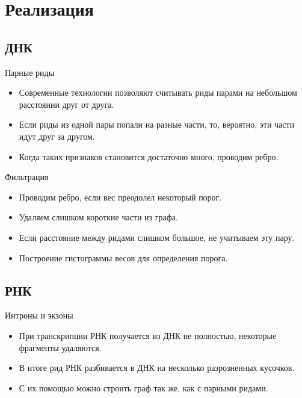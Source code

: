 \documentclass{beamer}
\newcommand{\cimg}[2]{%
	\begin{center}%
		\ifthenelse{\equal{#2}{}}{%
			\texttt{[image: \#1]}
		}{%
			\texttt{[image: \#1]}
		}%
	\end{center}%
}
\begin{document}
\section{Реализация}
\subsection{ДНК}

\begin{frame}[t]{Парные риды}
    \begin{itemize}
    \item
        Современные технологии позволяют считывать риды парами на небольшом
        расстоянии друг от друга.
    \item
        Если риды из одной пары попали на разные части, то, вероятно, эти части
        идут друг за другом.
    \item
        Когда таких признаков становится достаточно много, проводим ребро.
    \end{itemize}
    \cimg{2.jpg}{0.75}
\end{frame}

\begin{frame}[t]{Фильтрация}
    \begin{itemize}
    \item
        Проводим ребро, если вес преодолел некоторый порог.
    \item
        Удаляем слишком короткие части из графа.
    \item
        Если расстояние между ридами слишком большое, не учитываем эту пару.
    \item
        Построение гистограммы весов для определения порога.
    \end{itemize}
\end{frame}

\subsection{РНК}

\begin{frame}[t]{Интроны и экзоны}
    \begin{itemize}
    \item
        При транскрипции РНК получается из ДНК не полностью, некоторые фрагменты 
        удаляются.
    \item
        В итоге рид РНК разбивается в ДНК на несколько разрозненных кусочков.
    \item
        С их помощью можно строить граф так же, как с парными ридами.
    \end{itemize}
    \cimg{3.jpg}{0.75}
\end{frame}
\end{document}
